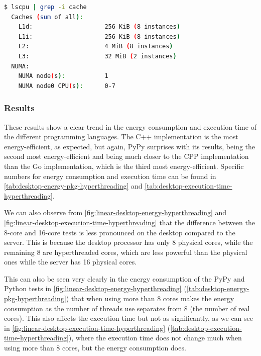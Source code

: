 \begin{lstlisting}[language=bash, caption={Cache of the AMD Ryzen 3800x}, label={lst:ryzen-cache}]
  $ lscpu | grep -i cache
  Caches (sum of all):
    L1d:                    256 KiB (8 instances)
    L1i:                    256 KiB (8 instances)
    L2:                     4 MiB (8 instances)
    L3:                     32 MiB (2 instances)
  NUMA:
    NUMA node(s):           1
    NUMA node0 CPU(s):      0-7
  \end{lstlisting}


\subsubsection{Results}






These results show a clear trend in the energy consumption and execution time of the different programming languages. The C++ implementation is the most energy-efficient, as expected, but again, PyPy surprises with its results, being the second most energy-efficient and being much closer to the \gls{CPP} implementation than the Go implementation, which is the third most energy-efficient. Specific numbers for energy consumption and execution time can be found in \autoref{tab:desktop-energy-pkg-hyperthreading} and \autoref{tab:desktop-execution-time-hyperthreading}.

We can also observe from \autoref{fig:linear-desktop-energy-hyperthreading} and \autoref{fig:linear-desktop-execution-time-hyperthreading} that the difference between the 8-core and 16-core tests is less pronounced on the desktop compared to the server. This is because the desktop processor has only 8 physical cores, while the remaining 8 are hyperthreaded cores, which are less powerful than the physical ones while the server has 16 physical cores.

This can also be seen very clearly in the energy consumption of the PyPy and Python tests in \autoref{fig:linear-desktop-energy-hyperthreading} (\autoref{tab:desktop-energy-pkg-hyperthreading}) that when using more than 8 cores makes the energy consumption as the number of threads use separates from 8 (the number of real cores). This also affects the execution time but not as significantly, as we can see in \autoref{fig:linear-desktop-execution-time-hyperthreading} (\autoref{tab:desktop-execution-time-hyperthreading}), where the execution time does not change much when using more than 8 cores, but the energy consumption does.

